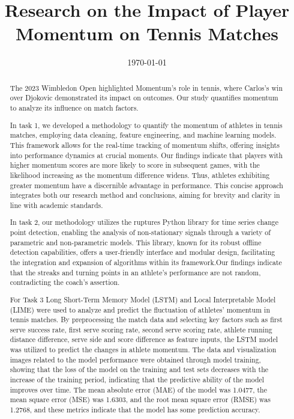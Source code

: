\documentclass{mcmthesis}
\title{Research on the Impact of Player Momentum on Tennis Matches}
\date{\today}
\begin{document}
\begin{abstract}
    \qquad The 2023 Wimbledon Open highlighted Momentum's role in tennis, where Carlos's win over Djokovic demonstrated its impact on outcomes. Our study quantifies momentum to analyze its influence on match factors.

    In task 1, we developed a methodology to quantify the momentum of athletes in tennis matches, employing data cleaning, feature engineering, and machine learning models. This framework allows for the real-time tracking of momentum shifts, offering insights into performance dynamics at crucial moments. Our findings indicate that players with higher momentum scores are more likely to score in subsequent games, with the likelihood increasing as the momentum difference widens. Thus, athletes exhibiting greater momentum have a discernible advantage in performance. This concise approach integrates both our research method and conclusions, aiming for brevity and clarity in line with academic standards.

    In task 2, our methodology utilizes the ruptures Python library for time series change point detection, enabling the analysis of non-stationary signals through a variety of parametric and non-parametric models. This library, known for its robust offline detection capabilities, offers a user-friendly interface and modular design, facilitating the integration and expansion of algorithms within its framework.Our findings indicate that the streaks and turning points in an athlete's performance are not random, contradicting the coach's assertion.

    For Task 3 Long Short-Term Memory Model (LSTM) and Local Interpretable Model (LIME) were used to analyze and predict the fluctuation of athletes' momentum in tennis matches. By preprocessing the match data and selecting key factors such as first serve success rate, first serve scoring rate, second serve scoring rate, athlete running distance difference, serve side and score difference as feature inputs, the LSTM model was utilized to predict the changes in athlete momentum. The data and visualization images related to the model performance were obtained through model training, showing that the loss of the model on the training and test sets decreases with the increase of the training period, indicating that the predictive ability of the model improves over time. The mean absolute error (MAE) of the model was 1.0477, the mean square error (MSE) was 1.6303, and the root mean square error (RMSE) was 1.2768, and these metrics indicate that the model has some prediction accuracy.


\end{abstract}
\end{document}
